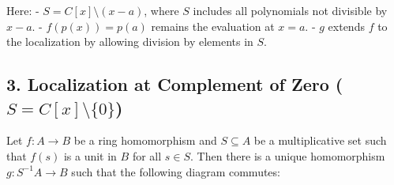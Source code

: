 \documentclass[11pt,openany]{article}
\begin{document}
Here:
- \( S = C[x] \setminus (x-a) \), where \( S \) includes all polynomials not divisible by \( x-a \).
- \( f(p(x)) = p(a) \) remains the evaluation at \( x = a \).
- \( g \) extends \( f \) to the localization by allowing division by elements in \( S \).


\subsection*{3. Localization at Complement of Zero (\( S = C[x] \setminus \{0\} \))}

\begin{tikzpicture}[>=stealth]
\end{tikzpicture}
\newpage
\begin{proposition}
	Let $f:A\to B$ be a ring homomorphism and $S\subseteq A$ be a multiplicative set such that $f(s)$ is a unit in $B$ for all $s\in S$. Then there is a unique homomorphism $g:S^{-1}A\to B$ such that the following diagram commutes:
\end{proposition}
\begin{center}
\end{center}
\end{document}
